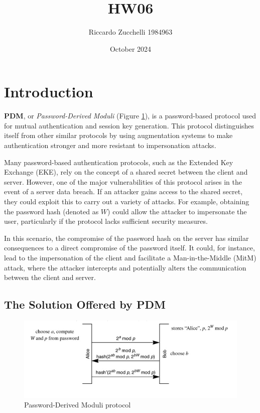 \documentclass{article}
\title{HW06}
\author{Riccardo Zucchelli 1984963}
\date{October 2024}
\begin{document}
\maketitle

\section{Introduction}
\textbf{PDM}, or \textit{Password-Derived Moduli} (Figure \ref{fig:pdm}), is a password-based protocol used for mutual authentication and session key generation. This protocol distinguishes itself from other similar protocols by using augmentation systems to make authentication stronger and more resistant to impersonation attacks. 

Many password-based authentication protocols, such as the Extended Key Exchange (EKE), rely on the concept of a shared secret between the client and server. However, one of the major vulnerabilities of this protocol arises in the event of a server data breach. If an attacker gains access to the shared secret, they could exploit this to carry out a variety of attacks. For example, obtaining the password hash (denoted as \( W \)) could allow the attacker to impersonate the user, particularly if the protocol lacks sufficient security measures.

In this scenario, the compromise of the password hash on the server has similar consequences to a direct compromise of the password itself. It could, for instance, lead to the impersonation of the client and facilitate a Man-in-the-Middle (MitM) attack, where the attacker intercepts and potentially alters the communication between the client and server.
\subsection*{The Solution Offered by PDM}
\begin{figure}[h]
    \centering
    \includegraphics[width=0.8\linewidth]{pdm.png}
    \caption{Password-Derived Moduli protocol}
    \label{fig:pdm}
\end{figure}
\end{document}
